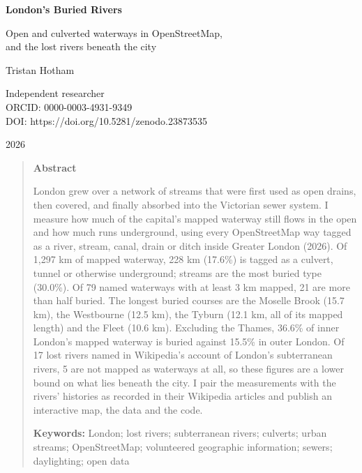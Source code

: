\documentclass[11pt,a4paper]{article}
\begin{document}
\begin{center}
{\Large\bfseries London's Buried Rivers\par}
\vspace{0.4em}
{\large Open and culverted waterways in OpenStreetMap,\\and the lost rivers beneath the city\par}
\vspace{1.2em}
{\large Tristan Hotham\par}
\vspace{0.3em}
{\small Independent researcher\\
ORCID: 0000-0003-4931-9349\\
DOI: https://doi.org/10.5281/zenodo.23873535\par}
\vspace{0.8em}
2026
\end{center}

\begin{quote}
\small
\begin{center}\textbf{Abstract}\end{center}
London grew over a network of streams that were first used as open drains, then covered, and finally absorbed into the Victorian sewer system. I measure how much of the capital's mapped waterway still flows in the open and how much runs underground, using every OpenStreetMap way tagged as a river, stream, canal, drain or ditch inside Greater London (2026). Of 1,297 km of mapped waterway, 228 km (17.6\%) is tagged as a culvert, tunnel or otherwise underground; streams are the most buried type (30.0\%). Of 79 named waterways with at least 3 km mapped, 21 are more than half buried. The longest buried courses are the Moselle Brook (15.7 km), the Westbourne (12.5 km), the Tyburn (12.1 km, all of its mapped length) and the Fleet (10.6 km). Excluding the Thames, 36.6\% of inner London's mapped waterway is buried against 15.5\% in outer London. Of 17 lost rivers named in Wikipedia's account of London's subterranean rivers, 5 are not mapped as waterways at all, so these figures are a lower bound on what lies beneath the city. I pair the measurements with the rivers' histories as recorded in their Wikipedia articles and publish an interactive map, the data and the code.

\textbf{Keywords:} London; lost rivers; subterranean rivers; culverts; urban streams; OpenStreetMap; volunteered geographic information; sewers; daylighting; open data
\end{quote}
\end{document}
